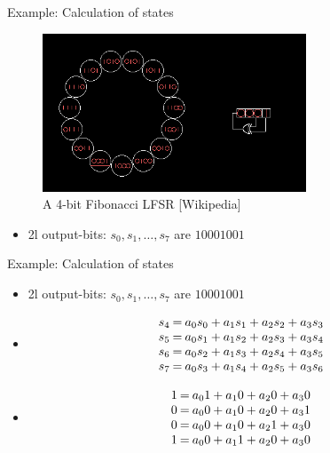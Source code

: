 \documentclass[]{beamer}
\begin{document}
\begin{frame}[t]{Example: Calculation of states}
\begin{figure}[ht]
\centering
\includegraphics[width=0.7\textwidth]{example_lfsr.png}
\caption{A 4-bit Fibonacci LFSR [Wikipedia]}
\label{fig:example}
\end{figure}

\begin{itemize}
  \item<2-> 2l output-bits: $s_0,s_1,\dots,s_{7}$ are $10001001$
\end{itemize}
\end{frame}

\begin{frame}[t]{Example: Calculation of states}
\begin{itemize}
\item<1-> 2l output-bits: $s_0,s_1,\dots,s_{7}$ are $10001001$ 
\item<1->
        \[
                \begin{array}{l@{\:=\:}l@{\:+\:}l@{\:+\:}l@{\:+\:}l}
                        s_4 & a_0s_0 & a_1s_1  & a_2s_2 & a_3s_3 \\
                        s_5 & a_0s_1 & a_1s_2  & a_2s_3 & a_3s_4 \\
                        s_6 & a_0s_2 & a_1s_3  & a_2s_4 & a_3s_5 \\
                        s_7 & a_0s_3 & a_1s_4  & a_2s_5 & a_3s_6 \\
                \end{array}
        \]
   
\item<2->
        \[
                \begin{array}{l@{\:=\:}l@{\:+\:}l@{\:+\:}l@{\:+\:}l}
                        1 & a_01 & a_10  & a_20 & a_30\\
                        0 & a_00 & a_10  & a_20 & a_31 \\
                        0 & a_00 & a_10  & a_21 & a_30 \\
                        1 & a_00 & a_11  & a_20 & a_30 \\
                \end{array}
        \]

\end{itemize}
\end{frame}
\end{document}

